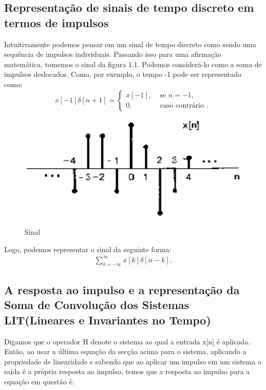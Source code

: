 \documentclass[dvipdfm, a4paper, 11pt]{report}
\begin{document}
{\subsection{Representação de sinais de tempo discreto em termos de impulsos}
Intuitivamente podemos pensar em um sinal de tempo discreto como sendo uma sequência de  impulsos individuais. Passando isso para uma afirmação matemática, tomemos o sinal da figura 1.1. Podemos considerá-lo como a soma de impulsos deslocados. Como, por exemplo, o tempo -1 pode ser representado como:\cite{oppenheim} \\
\[ x[-1]\delta[n+1] = 
\begin{cases}
x[-1], &\text{ se } n = -1, \\
0, &\text{ caso contrário }.
\end{cases}\]
\begin{figure}
\includegraphics[scale = 0.5]{sinal_figura.eps}
\label{figura}
\caption{Sinal}
\end{figure}
Logo, podemos representar o sinal da seguinte forma:\\

\begin{gather*}
\sum_{k=-\infty}^\infty x[k]\delta[n-k].
\end{gather*}

\subsection{A resposta ao impulso e a representação da Soma de Convolução dos Sistemas LIT(Lineares e Invariantes no Tempo)}
Digamos que o operador H denote o sistema ao qual a entrada x[n] é aplicada. Então, ao usar a última equação da secção acima para o sistema, aplicando a propriedade de linearidade e sabendo que ao aplicar um impulso em um sistema a saída é a própria resposta ao impulso, temos que a resposta ao impulso para a equação em questão é:\cite{haykin}\\

}
\end{document}
